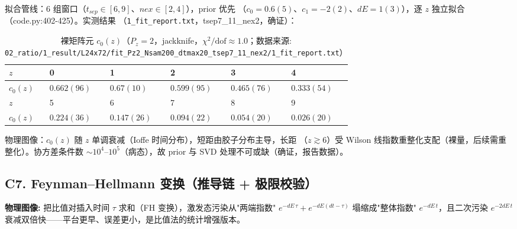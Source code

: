 \documentclass[UTF8]{ctexart}
\begin{document}
拟合管线：6 组窗口（$t_{sep}\in[6,9]$、$nex\in[2,4]$），prior 优先
（$c_0=0.6(5)$、$c_1=-2(2)$、$dE=1(3)$），逐 $z$ 独立拟合（code.py:402-425）。实测结果
（\texttt{\nolinkurl{1_fit_report.txt}}，tsep7\_11\_nex2，\textcolor{accent}{确证}）：

\begin{table}[htbp]\centering
\begin{tabularx}{0.95\textwidth}{lXXXXX}
\toprule
$z$ & 0 & 1 & 2 & 3 & 4 \\
\midrule
$c_0(z)$ & $0.662(96)$ & $0.67(10)$ & $0.599(95)$ & $0.465(76)$ & $0.333(54)$ \\
$z$ & 5 & 6 & 7 & 8 & 9 \\
\midrule
$c_0(z)$ & $0.224(36)$ & $0.147(26)$ & $0.094(22)$ & $0.054(20)$ & $0.026(20)$ \\
\bottomrule
\end{tabularx}
\caption{裸矩阵元 $c_0(z)$（$P_z=2$，jackknife，$\chi^2/\text{dof}\approx1.0$；数据来源:
\texttt{\nolinkurl{02_ratio/1_result/L24x72/fit_Pz2_Nsam200_dtmax20_tsep7_11_nex2/1_fit_report.txt}}）}
\end{table}

\noindent 物理图像：$c_0(z)$ 随 $z$ 单调衰减（Ioffe 时间分布），短距由胶子分布主导，长距
（$z\gtrsim6$）受 Wilson 线指数重整化支配（裸量，后续需重整化）。协方差条件数
$\sim10^4$--$10^5$（病态），故 prior 与 SVD 处理不可或缺（\textcolor{accent}{确证}，报告数据）。




\subsection{C7. Feynman--Hellmann 变换（推导链 + 极限校验）}

\begin{physbox}
\textbf{物理图像:} 把比值对插入时间 $\tau$ 求和（FH 变换），激发态污染从"两端指数"
$e^{-dE\,\tau}+e^{-dE(dt-\tau)}$ 塌缩成"整体指数" $e^{-dE\,t}$，且二次污染 $e^{-2dE\,t}$
衰减双倍快——平台更早、误差更小，是比值法的统计增强版本。
\end{physbox}
\end{document}
